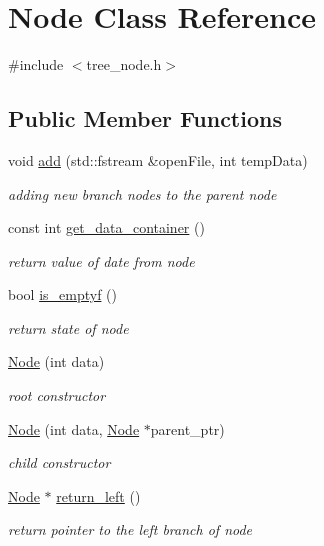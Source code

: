 \hypertarget{class_node}{}\section{Node Class Reference}
\label{class_node}


{\ttfamily \#include $<$tree\+\_\+node.\+h$>$}

\subsection*{Public Member Functions}
\begin{DoxyCompactItemize}
\item 
void \hyperlink{class_node_ace073e8a8e2688a520e432360a4212f5}{add} (std\+::fstream \&open\+File, int temp\+Data)
\begin{DoxyCompactList}\small\item\em adding new branch nodes to the parent node \end{DoxyCompactList}\item 
const int \hyperlink{class_node_a76d508260acf793cffe7115d3a3a81ba}{get\+\_\+data\+\_\+container} ()
\begin{DoxyCompactList}\small\item\em return value of date from node \end{DoxyCompactList}\item 
bool \hyperlink{class_node_a2016871f73cb26fd033bbaa07ff91425}{is\+\_\+emptyf} ()
\begin{DoxyCompactList}\small\item\em return state of node \end{DoxyCompactList}\item 
\hyperlink{class_node_a0d68253f48f4deb1e078ef6cf08a5bf4}{Node} (int data)
\begin{DoxyCompactList}\small\item\em root constructor \end{DoxyCompactList}\item 
\hyperlink{class_node_a096e084c1e92bef24a06b09fd9fb7249}{Node} (int data, \hyperlink{class_node}{Node} $\ast$parent\+\_\+ptr)
\begin{DoxyCompactList}\small\item\em child constructor \end{DoxyCompactList}\item 
\hyperlink{class_node}{Node} $\ast$ \hyperlink{class_node_a82da98f383fdd0649c037b454432487d}{return\+\_\+left} ()
\begin{DoxyCompactList}\small\item\em return pointer to the left branch of node \end{DoxyCompactList}\item 

\end{DoxyCompactItemize}
